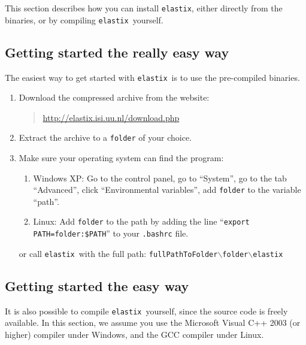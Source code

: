 \documentclass[]{report}
\newcommand{\elastix}{\texttt{elastix}}
\begin{document}
This section describes how you can install \elastix, either directly
from the binaries, or by compiling \elastix\ yourself.

\subsection{Getting started the really easy way}

The easiest way to get started with \elastix\ is to use the
pre-compiled binaries.
\begin{enumerate}
\item Download the compressed archive from the website:
    \begin{quote}
    \url{http://elastix.isi.uu.nl/download.php}
    \end{quote}

\item Extract the archive to a \texttt{folder} of your choice.

\item Make sure your operating system can find the program:
    \begin{enumerate}
    \item Windows XP: Go to the control panel, go to ``System'', go to
    the tab ``Advanced'', click ``Environmental variables'', add \texttt{folder}
    to the variable ``path''.

    \item Linux: Add \texttt{folder} to the path by adding the line
    ``\texttt{export PATH=folder:\$PATH}'' to your \texttt{.bashrc} file.
    \end{enumerate}
    or call \elastix\ with the full path:
    \texttt{fullPathToFolder$\backslash$folder$\backslash$elastix}
\end{enumerate}

\subsection{Getting started the easy way}

It is also possible to compile \elastix\ yourself, since the source code is
freely available. In this section, we assume you use the Microsoft Visual C++
2003 (or higher) compiler under Windows, and the GCC compiler under Linux.
\end{document}
